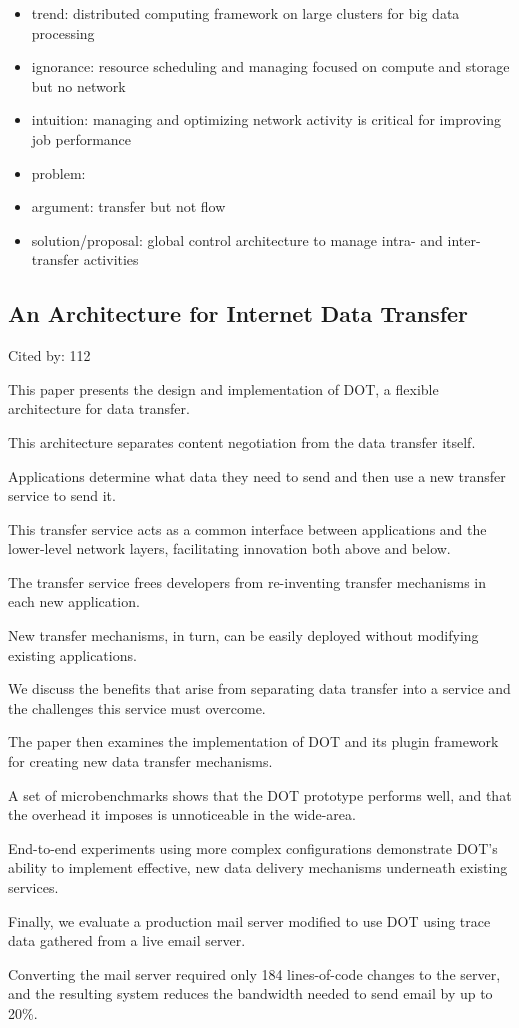 \documentclass[a4paper,11pt]{article}
\begin{document}
{\color{blue} \small
\begin{itemize}
\item trend: distributed computing framework on large clusters for big data processing
\item ignorance: resource scheduling and managing focused on compute and storage but no network
\item intuition: managing and optimizing network activity is critical for improving job performance
\item problem: 
\item argument: transfer but not flow
\item solution/proposal: global control architecture to manage intra- and inter- transfer activities
\end{itemize}	
}

\subsection*{An Architecture for Internet Data Transfer}
{\color{cyan} {\color{magenta} Cited by: 112}

This paper 
presents the 
design and implementation of
{\color{black} DOT\cite{dot}}, 
a flexible architecture for data transfer. 

This architecture
separates content negotiation from the data transfer itself. 

Applications determine what data they need to send and then use a new transfer service to send it. 

This transfer service 
acts as a common interface 
between applications and the lower-level network layers, 
facilitating innovation both above and below. 

The transfer service 
frees developers from re-inventing transfer mechanisms in each new application. 

New transfer mechanisms, in turn, can be easily deployed without modifying existing applications.

We discuss the 
benefits that arise from separating data transfer into a service and 
the challenges this service must overcome. 

The paper then examines the implementation of
DOT and its plugin framework for creating new data transfer mechanisms. 

A set of 
microbenchmarks 
shows that the DOT prototype performs well, and that 
the overhead it imposes is unnoticeable in the wide-area. 

End-to-end experiments 
using more complex configurations 
demonstrate DOT's ability to implement effective, new data delivery
mechanisms underneath existing services. 

Finally, we
evaluate a production mail server modified to use DOT 
using trace data gathered from a live email server. 

Converting the mail server required only 184 lines-of-code changes to the server, and 
the resulting system reduces the bandwidth needed to send email by up to 20\%.	

}
\end{document}
